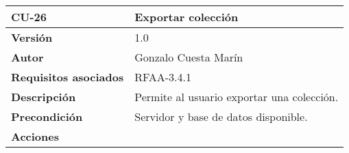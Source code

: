 \begin{longtable}[]{@{}ll@{}}
\toprule
\begin{minipage}[b]{0.26\columnwidth}\raggedright
\textbf{CU-26}\strut
\end{minipage} & \begin{minipage}[b]{0.68\columnwidth}\raggedright
\textbf{Exportar colección}\strut
\end{minipage}\tabularnewline
\midrule
\endhead
\begin{minipage}[t]{0.26\columnwidth}\raggedright
\textbf{Versión}\strut
\end{minipage} & \begin{minipage}[t]{0.68\columnwidth}\raggedright
1.0\strut
\end{minipage}\tabularnewline
\begin{minipage}[t]{0.26\columnwidth}\raggedright
\textbf{Autor}\strut
\end{minipage} & \begin{minipage}[t]{0.68\columnwidth}\raggedright
Gonzalo Cuesta Marín\strut
\end{minipage}\tabularnewline
\begin{minipage}[t]{0.26\columnwidth}\raggedright
\textbf{Requisitos asociados}\strut
\end{minipage} & \begin{minipage}[t]{0.68\columnwidth}\raggedright
RFAA-3.4.1\strut
\end{minipage}\tabularnewline
\begin{minipage}[t]{0.26\columnwidth}\raggedright
\textbf{Descripción}\strut
\end{minipage} & \begin{minipage}[t]{0.68\columnwidth}\raggedright
Permite al usuario exportar una colección.\strut
\end{minipage}\tabularnewline
\begin{minipage}[t]{0.26\columnwidth}\raggedright
\textbf{Precondición}\strut
\end{minipage} & \begin{minipage}[t]{0.68\columnwidth}\raggedright
Servidor y base de datos disponible.\strut
\end{minipage}\tabularnewline
\begin{minipage}[t]{0.26\columnwidth}\raggedright
\textbf{Acciones}\strut
\end{minipage} & \begin{minipage}[t]{0.68\columnwidth}\raggedright
\begin{enumerate}
\def\labelenumi{\arabic{enumi}.}

\end{enumerate}
\end{minipage}
\end{longtable}
